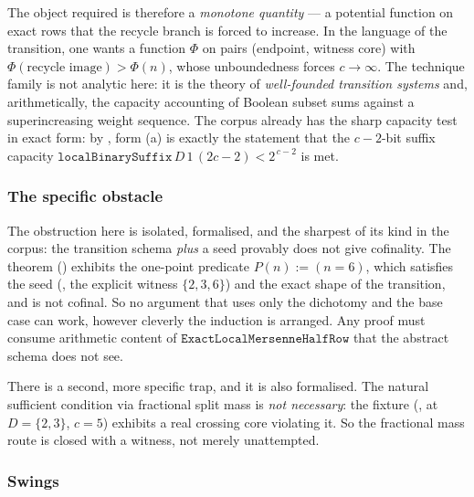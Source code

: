 The object required is therefore a \emph{monotone quantity} --- a potential function on exact
rows that the recycle branch is forced to increase. In the language of the transition, one wants
a function $\Phi$ on pairs (endpoint, witness core) with $\Phi(\text{recycle image})>\Phi(n)$,
whose unboundedness forces $c\to\infty$. The technique family is not analytic here: it is the
theory of \emph{well-founded transition systems} and, arithmetically, the capacity accounting of
Boolean subset sums against a superincreasing weight sequence. The corpus already has the sharp
capacity test in exact form: by
,
form (a) is exactly the statement that the $c-2$-bit suffix capacity
$\mathtt{localBinarySuffix}\,D\,1\,(2c-2)<2^{\,c-2}$ is met.

\subsubsection*{The specific obstacle}

The obstruction here is isolated, formalised, and the sharpest of its kind in the corpus: the
transition schema \emph{plus} a seed provably does not give cofinality. The theorem
() exhibits the one-point predicate $P(n):=(n=6)$, which satisfies the seed
(, the explicit witness
$\{2,3,6\}$) and the exact shape of the transition, and is not cofinal. So no argument that uses
only the dichotomy and the base case can work, however cleverly the induction is arranged. Any
proof must consume arithmetic content of $\mathtt{ExactLocalMersenneHalfRow}$ that the abstract
schema does not see.

There is a second, more specific trap, and it is also formalised. The natural sufficient
condition via fractional split mass is \emph{not necessary}: the fixture
(, at $D=\{2,3\}$, $c=5$) exhibits a real crossing core violating it. So the fractional
mass route is closed with a witness, not merely unattempted.

\subsubsection*{Swings}

